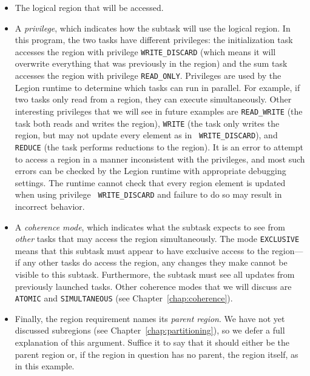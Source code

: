 \begin{itemize}

\item The logical region that will be accessed.

\item A {\em privilege}, which indicates how the subtask will
  use the logical region.  In this program, the two tasks have
  different privileges: the initialization task accesses the region
  with privilege {\tt WRITE\_DISCARD} (which means it will overwrite
  everything that was previously in the region) and the sum task
  accesses the region with privilege {\tt READ\_ONLY}.  Privileges are
  used by the Legion runtime to determine which tasks can run in
  parallel.  For example, if two tasks only read from a region, they
  can execute simultaneously.  Other interesting privileges that we
  will see in future examples are {\tt READ\_WRITE} (the task both
  reads and writes the region), {\tt WRITE} (the task only writes the
  region, but may not update every element as in {\tt
    WRITE\_DISCARD}), and {\tt REDUCE} (the task performs reductions
  to the region).  It is an error to attempt to access a region in a
  manner inconsistent with the privileges, and most such errors can be
  checked by the Legion runtime with appropriate debugging settings.
  The runtime cannot check
  that every region element is updated when using privilege {\tt
    WRITE\_DISCARD} and failure to do so may result in incorrect
  behavior.

\item A {\em coherence mode}, which indicates what the subtask expects to see from {\em other} tasks that may access the
region simultaneously.  The mode {\tt EXCLUSIVE} means that this subtask must appear to have exclusive access to the region---if
any other tasks do access the region, any changes they make cannot be visible to this subtask. Furthermore, the subtask
must see all updates from previously launched tasks. Other coherence modes that we will discuss are {\tt ATOMIC} and
{\tt SIMULTANEOUS} (see Chapter~\ref{chap:coherence}).

\item Finally, the region requirement names its {\em parent region}.
  We have not yet discussed subregions (see
  Chapter~\ref{chap:partitioning}), so we defer a full explanation of
  this argument.  Suffice it to say that it should either be the
  parent region or, if the region in question has no parent, the
  region itself, as in this example.

\end{itemize}

